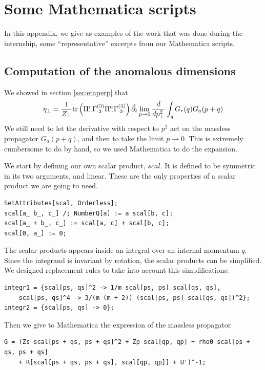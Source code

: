 \chapter{Some Mathematica scripts}

In this appendix, we give as examples of the work that was done during the internship, some ``representative'' excerpts from our Mathematica scripts.

\section{Computation of the anomalous dimensions}

We showed in section \eqref{sec:etaperp} that 
\begin{align}
\eta_\perp = \frac{1}{Z_\perp}  \text{tr}\left(\Pi^r_{\cdot \cdot} \Gamma^{(3)}_{\cdot2\cdot} \Pi^a_{\cdot \cdot} \Gamma^{(3)}_{\cdot2\cdot}\right)  \hat{\partial_{t}} \lim_{p \rightarrow 0} \frac{d}{dp^2_\perp} \int_q G_r(q) G_a(p+q)
\end{align}
We still need to let the derivative with respect to $p^2$ act on the massless propagator $G_a(p+q)$, and then to take the limit $p \rightarrow 0$. This is extremely cumbersome to do by hand, so we used Mathematica to do the expansion.

We start by defining our own scalar product, $scal$. It is defined to be symmetric in its two arguments, and linear. These are the only properties of a scalar product we are going to need.
\begin{lstlisting}
SetAttributes[scal, Orderless];
scal[a_ b_, c_] /; NumberQ[a] := a scal[b, c];
scal[a_ + b_, c_] := scal[a, c] + scal[b, c];
scal[0, a_] := 0;
\end{lstlisting}

The scalar products appears inside an integral over an internal momentum $q$. Since the integrand is invariant by rotation, the scalar products can be simplified. We designed replacement rules to take into account this simplifications:
\begin{lstlisting}
integr1 = {scal[ps, qs]^2 -> 1/m scal[ps, ps] scal[qs, qs],  
	scal[ps, qs]^4 -> 3/(m (m + 2)) (scal[ps, ps] scal[qs, qs])^2};
integr2 = {scal[ps, qs] -> 0};
\end{lstlisting}

Then we give to Mathematica the expression of the massless propagator
\begin{lstlisting}
G = (Zs scal[ps + qs, ps + qs]^2 + Zp scal[qp, qp] + rho0 scal[ps + qs, ps + qs] 
	+ R[scal[ps + qs, ps + qs], scal[qp, qp]] + U')^-1;
\end{lstlisting}

